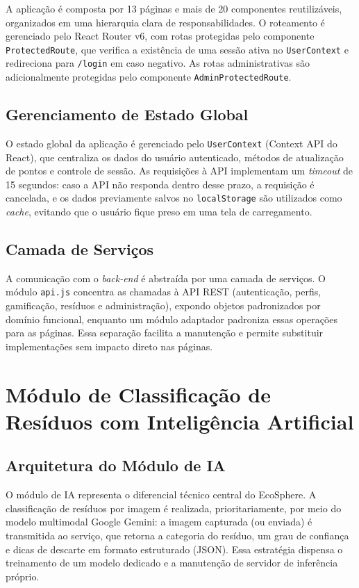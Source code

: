 \documentclass[
	12pt,
	openright,
	oneside,
	a4paper,
	chapter=TITLE,
	section=TITLE,
	subsection=TITLE,
	subsubsection=TITLE,
	english,
	brazil
	]{abntex2}
\begin{document}
A aplicação é composta por 13 páginas e mais de 20 componentes reutilizáveis, organizados em uma hierarquia clara de responsabilidades. O roteamento é gerenciado pelo React Router v6, com rotas protegidas pelo componente \texttt{ProtectedRoute}, que verifica a existência de uma sessão ativa no \texttt{UserContext} e redireciona para \texttt{/login} em caso negativo. As rotas administrativas são adicionalmente protegidas pelo componente \texttt{AdminProtectedRoute}.

\subsection{Gerenciamento de Estado Global}

O estado global da aplicação é gerenciado pelo \texttt{UserContext} (Context API do React), que centraliza os dados do usuário autenticado, métodos de atualização de pontos e controle de sessão. As requisições à API implementam um \textit{timeout} de 15 segundos: caso a API não responda dentro desse prazo, a requisição é cancelada, e os dados previamente salvos no \texttt{localStorage} são utilizados como \textit{cache}, evitando que o usuário fique preso em uma tela de carregamento.

\subsection{Camada de Serviços}

A comunicação com o \textit{back-end} é abstraída por uma camada de serviços. O módulo \texttt{api.js} concentra as chamadas à API REST (autenticação, perfis, gamificação, resíduos e administração), expondo objetos padronizados por domínio funcional, enquanto um módulo adaptador padroniza essas operações para as páginas. Essa separação facilita a manutenção e permite substituir implementações sem impacto direto nas páginas.

\section{Módulo de Classificação de Resíduos com Inteligência Artificial}

\subsection{Arquitetura do Módulo de IA}

O módulo de IA representa o diferencial técnico central do EcoSphere. A classificação de resíduos por imagem é realizada, prioritariamente, por meio do modelo multimodal Google Gemini: a imagem capturada (ou enviada) é transmitida ao serviço, que retorna a categoria do resíduo, um grau de confiança e dicas de descarte em formato estruturado (JSON). Essa estratégia dispensa o treinamento de um modelo dedicado e a manutenção de servidor de inferência próprio.
\end{document}

